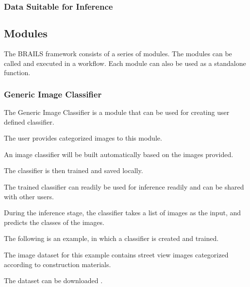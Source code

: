 \documentclass[letterpaper,10pt,english]{sphinxmanual}
\begin{document}
\subsubsection{Data Suitable for Inference}
\label{\detokenize{common/user_manual/dataPrep:data-suitable-for-inference}}

\subsection{Modules}
\label{\detokenize{common/user_manual/modules/modules:modules}}\label{\detokenize{common/user_manual/modules/modules:lbl-modules}}\label{\detokenize{common/user_manual/modules/modules::doc}}
\sphinxAtStartPar
The BRAILS framework consists of a series of modules.
The modules can be called and executed in a workflow. Each module can also be used as a standalone function.


\subsubsection{Generic Image Classifier}
\label{\detokenize{common/user_manual/modules/genericImageClassifier:generic-image-classifier}}\label{\detokenize{common/user_manual/modules/genericImageClassifier:lbl-genericimageclassifier}}\label{\detokenize{common/user_manual/modules/genericImageClassifier::doc}}
\sphinxAtStartPar
The Generic Image Classifier is a module that can be used for creating user defined classifier.

\sphinxAtStartPar
The user provides categorized images to this module.

\sphinxAtStartPar
An image classifier will be built automatically based on the images provided.

\sphinxAtStartPar
The classifier is then trained and saved locally.

\sphinxAtStartPar
The trained classifier can readily be used for inference readily and can be shared with other users.

\sphinxAtStartPar
During the inference stage, the classifier takes a list of images as the input, and predicts the classes of the images.

\sphinxAtStartPar
The following is an example, in which a classifier is created and trained.

\sphinxAtStartPar
The image dataset for this example contains street view images categorized according to construction materials.

\sphinxAtStartPar
The dataset can be downloaded .
\end{document}
